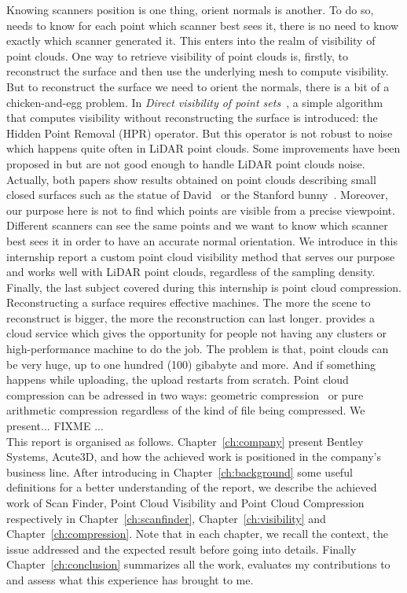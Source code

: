 Knowing scanners position is one thing, orient normals is another. To do so, \CC needs to know for each point which scanner best sees it, there is no need to know exactly which scanner generated it. This enters into the realm of visibility of point clouds. One way to retrieve visibility of point clouds is, firstly, to reconstruct the surface and then use the underlying mesh to compute visibility. But to reconstruct the surface we need to orient the normals, there is a bit of a
chicken-and-egg problem. In \emph{Direct visibility of point sets}~\cite{vis1}, a simple algorithm that computes visibility without reconstructing the surface is introduced: the Hidden Point Removal (HPR) operator. But this operator is not robust to noise which happens quite often in LiDAR point clouds. Some improvements have been proposed in \cite{vis2} but are not good enough to handle LiDAR point clouds noise. Actually, both papers show results obtained on point clouds
describing small closed surfaces such as the statue of David~\cite{david} or the Stanford bunny~\cite{bunny}. Moreover, our purpose here is not to find which points are visible from a precise viewpoint. Different scanners can see the same points and we want to know which scanner best sees it in order to have an accurate normal orientation. We introduce in this internship report a custom point cloud visibility method that serves our purpose and works well with LiDAR point clouds,
regardless of the sampling density.\\
Finally, the last subject covered during this internship is point cloud compression. Reconstructing a surface requires effective machines. The more the scene to reconstruct is bigger, the more the reconstruction can last longer. \CC provides a cloud service which gives the opportunity for people not having any clusters or high-performance machine to do the job. The problem is that, point clouds can be very huge, up to one hundred (100) gibabyte and more. And if something
happens while uploading, the upload restarts from scratch. Point cloud compression can be adressed in two ways: geometric compression~\cite{compress1, compress2} or pure arithmetic compression regardless of the kind of file being compressed. We present... FIXME ...\\

This report is organised as follows. Chapter~\ref{ch:company} present Bentley Systems, Acute3D, \CC and how the achieved work is positioned in the company's business line. After introducing in Chapter~\ref{ch:background} some useful definitions for a better understanding of the report, we describe the achieved work of Scan Finder, Point Cloud Visibility and Point Cloud Compression respectively in Chapter~\ref{ch:scanfinder}, Chapter~\ref{ch:visibility} and
Chapter~\ref{ch:compression}. Note that in each chapter, we recall the context, the issue addressed and the expected result before going into details. Finally Chapter~\ref{ch:conclusion} summarizes all the work, evaluates my contributions to \CC and assess what this experience has brought to me.
